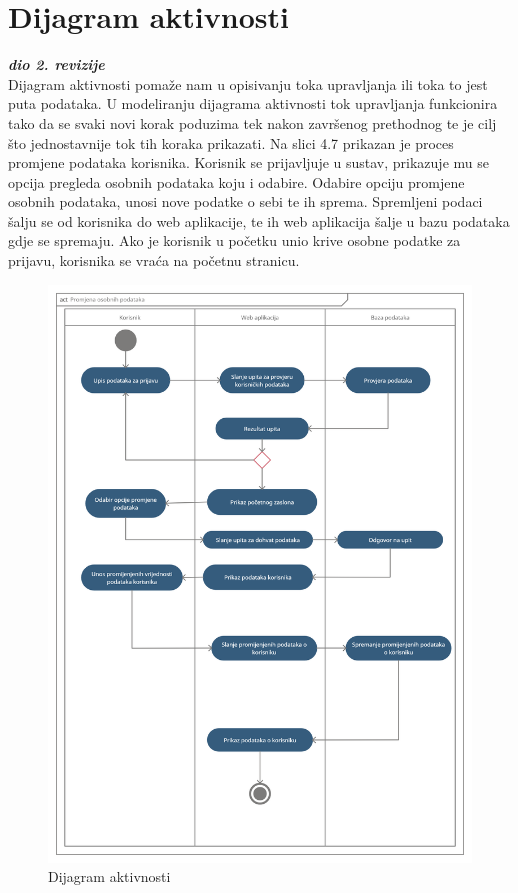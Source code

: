 			
			\eject 
		
		\section{Dijagram aktivnosti}
			
			\textbf{\textit{dio 2. revizije}}\\
            Dijagram aktivnosti pomaže nam u opisivanju toka upravljanja ili toka to jest puta podataka. U modeliranju dijagrama aktivnosti tok upravljanja funkcionira tako da se svaki novi korak poduzima tek nakon završenog prethodnog te je cilj što jednostavnije tok tih koraka prikazati. Na slici 4.7 prikazan je proces promjene podataka korisnika. Korisnik se prijavljuje u sustav, prikazuje mu se opcija pregleda osobnih podataka koju i odabire. Odabire opciju promjene osobnih podataka, unosi nove podatke o sebi te ih sprema. Spremljeni podaci šalju se od korisnika do web aplikacije, te ih web aplikacija šalje u bazu podataka gdje se spremaju. Ako je korisnik u početku unio krive osobne podatke za prijavu, korisnika se vraća na početnu stranicu.
			 
		\begin{figure}[H]
			\hspace*{-1.5cm}
			\includegraphics[scale=0.25]{dijagrami/dijagram_aktivnosti.png} %
			\centering
			\caption{Dijagram aktivnosti}
			\label{fig:promjene}
		\end{figure}
			
